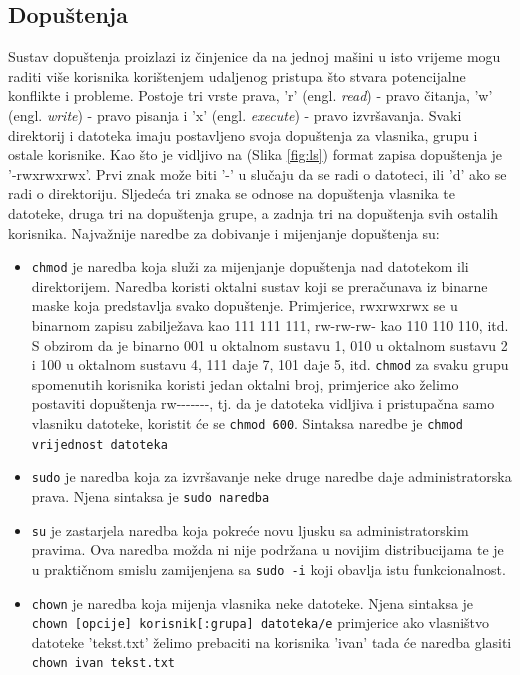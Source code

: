 \documentclass{foi}
\begin{document}
\subsection{Dopuštenja}
Sustav dopuštenja proizlazi iz činjenice da na jednoj mašini u isto vrijeme mogu raditi više korisnika korištenjem udaljenog pristupa što stvara potencijalne konflikte i probleme. Postoje tri vrste prava, 'r' (engl. \textit{read}) - pravo čitanja, 'w' (engl. \textit{write}) - pravo pisanja i 'x' (engl. \textit{execute}) - pravo izvršavanja. Svaki direktorij i datoteka imaju postavljeno svoja dopuštenja za vlasnika, grupu i ostale korisnike. Kao što je vidljivo na (Slika \ref{fig:ls}) format zapisa dopuštenja je '-rwxrwxrwx'. Prvi znak može biti '-' u slučaju da se radi o datoteci, ili 'd' ako se radi o direktoriju. Sljedeća tri znaka se odnose na dopuštenja vlasnika te datoteke, druga tri na dopuštenja grupe, a zadnja tri na dopuštenja svih ostalih korisnika.\cite{LinuxCommandPermissions}
Najvažnije naredbe za dobivanje i mijenjanje dopuštenja su:
\begin{itemize}
    \item \verb|chmod| je naredba koja služi za mijenjanje dopuštenja nad datotekom ili direktorijem. Naredba koristi oktalni sustav koji se preračunava iz binarne maske koja predstavlja svako dopuštenje. Primjerice, rwxrwxrwx se u binarnom zapisu zabilježava kao 111 111 111, rw-rw-rw- kao 110 110 110, itd. S obzirom da je binarno 001 u oktalnom sustavu 1, 010 u oktalnom sustavu 2 i 100 u oktalnom sustavu 4, 111 daje 7, 101 daje 5, itd. \verb|chmod| za svaku grupu spomenutih korisnika koristi jedan oktalni broj, primjerice ako želimo postaviti dopuštenja rw-{}-{}-{}-{}-{}-{}-, tj. da je datoteka vidljiva i pristupačna samo vlasniku datoteke, koristit će se \verb|chmod 600|. Sintaksa naredbe je \verb|chmod vrijednost datoteka|
    \item \verb|sudo| je naredba koja za izvršavanje neke druge naredbe daje administratorska prava. Njena sintaksa je \verb|sudo naredba|
    \item \verb|su| je zastarjela naredba koja pokreće novu ljusku sa administratorskim pravima. Ova naredba možda ni nije podržana u novijim distribucijama te je u praktičnom smislu zamijenjena sa \verb|sudo -i| koji obavlja istu funkcionalnost.
    \item \verb|chown| je naredba koja mijenja vlasnika neke datoteke. Njena sintaksa je \texttt{chown [opcije] korisnik[:grupa] datoteka/e} primjerice ako vlasništvo datoteke 'tekst.txt' želimo prebaciti na korisnika 'ivan' tada će naredba glasiti \verb|chown ivan tekst.txt|
\end{itemize}
\end{document}
